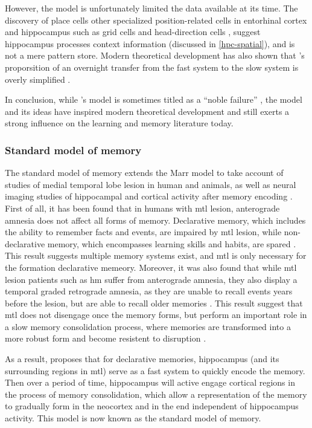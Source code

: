 However, the \citet{marr71} model is unfortunately limited the data available at its time. The discovery of place cells \citep{o'keefe71} other specialized position-related cells in entorhinal cortex and hippocampus such as grid cells and head-direction cells \citep{taube90, fyhn04, hafting05}, suggest hippocampus processes context information (discussed in \ref{hpc-spatial}), and is not a mere pattern store. Modern theoretical development has also shown that \citet{marr71}'s proporsition of an overnight transfer from the fast system to the slow system is overly simplified . 

In conclusion, while \citet{marr71}'s model is sometimes titled as a ``noble failure'' \citep{willshaw15}, the model and its ideas have inspired modern theoretical development and still exerts a strong influence on the learning and memory literature today. 




\subsubsection{Standard model of memory \label{hpc-squire}}
The standard model of memory extends the Marr model to take account of studies of medial temporal lobe lesion in human and animals, as well as neural imaging studies of hippocampal and cortical activity after memory encoding \citep{squire92, squire09}. First of all, it has been found that in humans with \gls{mtl} lesion, anterograde amnesia does not affect all forms of memory. Declarative memory, which includes the ability to remember facts and events, are impaired by \gls{mtl} lesion, while non-declarative memory, which encompasses learning skills and habits, are spared \citep{cohen80, squire04}. This result suggests multiple memory systems exist, and \gls{mtl} is only necessary for the formation declarative memeory. Moreover, it was also found that while \gls{mtl} lesion patients such as \gls{hm} suffer from anterograde amnesia, they also display a temporal graded retrograde amnesia, as they are unable to recall events years before the lesion, but are able to recall older memories \citep{marslen-wilson75}. This result suggest that \gls{mtl} does not disengage once the memory forms, but perform an important role in a slow memory consolidation process, where memories are transformed into a more robust form and become resistent to disruption \citep{squire92}. 

As a result, \citet{squire92} proposes that for declarative memories, hippocampus (and its surrounding regions in \gls{mtl}) serve as a fast system to quickly encode the memory. Then over a period of time, hippocampus will active engage cortical regions in the process of memory consolidation, which allow a representation of the memory to gradually form in the neocortex and in the end independent of hippocampus activity. This model is now known as the standard model of memory. 

